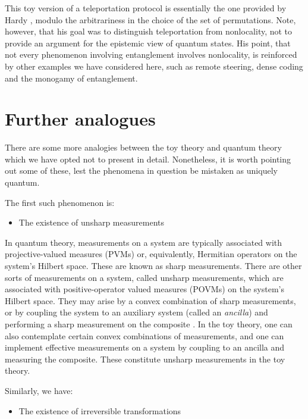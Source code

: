 \documentclass[pra,nofootinbib,showpacs,12pt]{revtex4}
\begin{document}
This toy version of a teleportation protocol is essentially the
one provided by Hardy \cite{Hardydisentangling}, modulo the
arbitrariness in the choice of the set of permutations. Note,
however, that his goal was to distinguish teleportation from
nonlocality, not to provide an argument for the epistemic view of
quantum states. His point, that not every phenomenon involving
entanglement involves nonlocality, is reinforced by other examples
we have considered here, such as remote steering, dense coding and
the monogamy of entanglement.

\section{Further analogues}

\label{otheranalogues}

There are some more analogies between the toy theory and quantum theory
which we have opted not to present in detail. Nonetheless, it is worth
pointing out some of these, lest the phenomena in question be mistaken as
uniquely quantum.

The first such phenomenon is:

\begin{itemize}
\item The existence of unsharp measurements
\end{itemize}

In quantum theory, measurements on a system are typically associated with
projective-valued measures (PVMs) or, equivalently, Hermitian operators on
the system's Hilbert space. These are known as sharp measurements. There are
other sorts of measurements on a system, called unsharp measurements, which
are associated with positive-operator valued measures (POVMs) on the
system's Hilbert space. They may arise by a convex combination of sharp
measurements, or by coupling the system to an auxiliary system (called an
\emph{ancilla}) and performing a sharp measurement on the composite \cite%
{NielsenChuang}. In the toy theory, one can also contemplate certain convex
combinations of measurements, and one can implement effective measurements
on a system by coupling to an ancilla and measuring the composite. These
constitute unsharp measurements in the toy theory.

Similarly, we have:

\begin{itemize}
\item The existence of irreversible transformations
\end{itemize}
\end{document}
